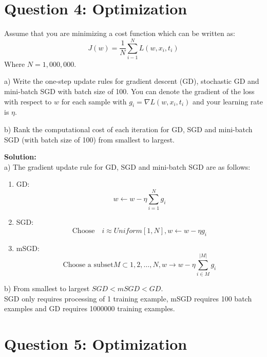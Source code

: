 \documentclass[12pt]{article}
\begin{document}
	\section*{Question 4: Optimization \cite{q4}}
	Assume that you are minimizing a cost function which can be written as:
	\begin{equation}
		J(w) = \frac{1}{N} \sum_{i-1}^{N} L(w, x_i, t_i)
	\end{equation}
	Where $N=1,000,000$.
	
	a) Write the one-step update rules for gradient descent (GD), stochastic GD and mini-batch SGD with batch size of 100. You can denote the gradient of the loss with respect to $w$ for each sample with $g_i = \nabla L(w,x_i,t_i)$ and your learning rate is $\eta$.
	
	b) Rank the computational cost of each iteration for GD, SGD and mini-batch SGD (with batch size of 100) from smallest to largest.
	
	\begin{framed}
		\textbf{Solution:}\\
		a) The gradient update rule for GD, SGD and mini-batch SGD are as follows:
		\begin{enumerate}
			\item{GD:}
			\begin{equation}
				w \leftarrow w - \eta \sum_{i=1}^{N} g_i
			\end{equation}
			\item{SGD:}
			\begin{equation}
				\text{Choose} \quad i \approx Uniform[1,N], w \leftarrow w - \eta g_i
			\end{equation}
			\item{mSGD:}
			\begin{equation}
				\text{Choose a subset} M \subset  {1,2, \dots , N}, w \rightarrow w - \eta \sum_{i \in M}^{|M|}g_i
			\end{equation}
		\end{enumerate}
		
		b) From smallest to largest $SGD < mSGD < GD$.\\
		SGD only requires processing of 1 training example, mSGD requires 100 batch examples and GD requires 1000000 training examples.
	\end{framed}
	
	\section*{Question 5: Optimization \cite{q4}}
	
\end{document}
